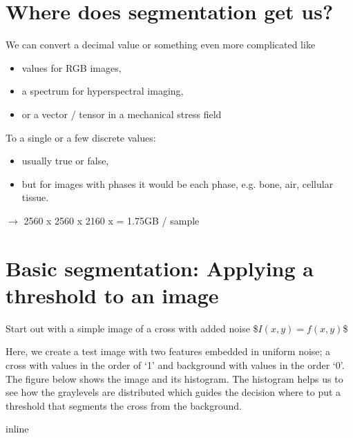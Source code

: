 \documentclass[letterpaper,10pt,english]{sphinxmanual}
\begin{document}
\section{Where does segmentation get us?}
\label{\detokenize{04-BasicSegmentation:where-does-segmentation-get-us}}
\sphinxAtStartPar
We can convert a decimal value or something even more complicated like
\begin{itemize}
\item {} 
 values for RGB images,

\item {} 
\sphinxAtStartPar
a spectrum for hyperspectral imaging,

\item {} 
\sphinxAtStartPar
or a vector / tensor in a mechanical stress field

\end{itemize}

\sphinxAtStartPar
To a single or a few discrete values:
\begin{itemize}
\item {} 
\sphinxAtStartPar
usually true or false,

\item {} 
\sphinxAtStartPar
but for images with phases it would be each phase, e.g. bone, air, cellular tissue.

\end{itemize}

\sphinxAtStartPar
{} \(\rightarrow\) 2560 x 2560 x 2160 x  = 1.75GB / sample


\section{Basic segmentation: Applying a threshold to an image}
\label{\detokenize{04-BasicSegmentation:basic-segmentation-applying-a-threshold-to-an-image}}
\sphinxAtStartPar
Start out with a simple image of a cross with added noise
\$\( I(x,y) = f(x,y) \)\$

\sphinxAtStartPar
Here, we create a test image with two features embedded in uniform noise; a cross with values in the order of ‘1’ and background with values in the order ‘0’. The figure below shows the image and its histogram. The histogram helps us to see how the graylevels are distributed which guides the decision where to put a threshold that segments the cross from the background.

\begin{sphinxVerbatim}[commandchars=\\\{\}]
 inline
   
   
\end{sphinxVerbatim}
\end{document}
